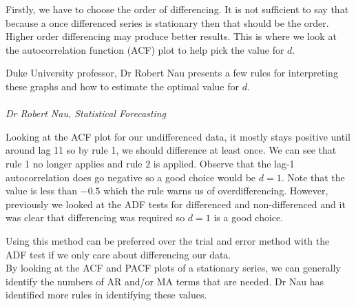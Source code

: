 \documentclass{article}
\begin{document}
  Firstly, we have to choose the order of differencing. It is not sufficient to say that because a once differenced series is stationary then that should be the order. Higher order differencing may produce better results. This is where we look at the autocorrelation function (ACF) plot to help pick the value for $d$. 

  Duke University professor, Dr Robert Nau presents a few rules for interpreting these graphs and how to estimate the optimal value for $d$.
  \newline
  \newline
  \emph{\\
  \\
  Dr Robert Nau, Statistical Forecasting}
  \newline

  Looking at the ACF plot for our undifferenced data, it mostly stays positive until around lag 11 so by rule 1, we should difference at least once. We can see that rule 1 no longer applies and rule 2 is applied. Observe that the lag-1 autocorrelation does go negative so a good choice would be $d=1$. Note that the value is less than $-0.5$ which the rule warns us of overdifferencing. However, previously we looked at the ADF tests for differenced and non-differenced and it was clear that differencing was required so $d=1$ is a good choice.

  Using this method can be preferred over the trial and error method with the ADF test if we only care about differencing our data.\\
  By looking at the ACF and PACF plots of a stationary series, we can generally identify the numbers of AR and/or MA terms that are needed. Dr Nau has identified more rules in identifying these values.
  \newline
  \newline
  \emph{\\
  }
  \newline
\end{document}
